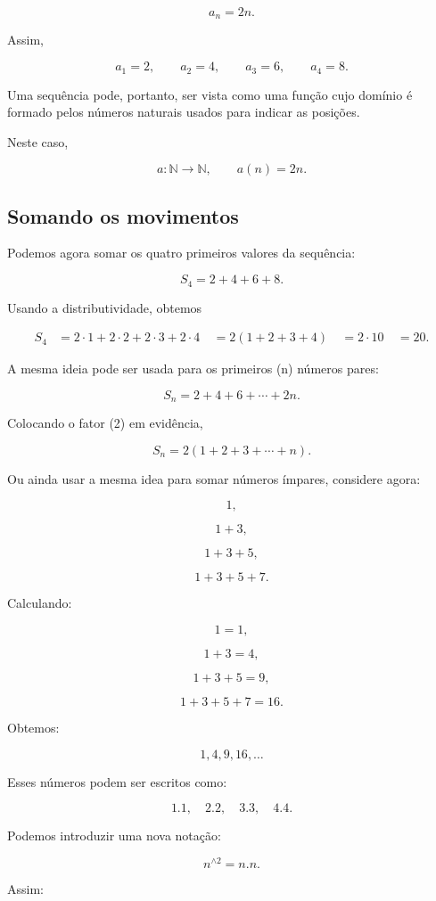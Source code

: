 \documentclass[12pt,a4paper]{article}
\begin{document}
\[
a_n=2n.
\]

Assim,

\[
a_1=2,\qquad
a_2=4,\qquad
a_3=6,\qquad
a_4=8.
\]

Uma sequência pode, portanto, ser vista como uma função cujo domínio é
formado pelos números naturais usados para indicar as posições.

Neste caso,

\[
a\colon\mathbb{N}\longrightarrow\mathbb{N},
\qquad
a(n)=2n.
\]

\subsection{Somando os movimentos}

Podemos agora somar os quatro primeiros valores da sequência:

\[
S_4=2+4+6+8.
\]

Usando a distributividade, obtemos

\[
\begin{aligned}
S_4
&=2\cdot1+2\cdot2+2\cdot3+2\cdot4\
&=2(1+2+3+4)\
&=2\cdot10\
&=20.
\end{aligned}
\]

A mesma ideia pode ser usada para os primeiros (n) números pares:

\[
S_n=2+4+6+\cdots+2n.
\]

Colocando o fator (2) em evidência,

\[
S_n=2(1+2+3+\cdots+n).
\]


Ou ainda usar a mesma idea para somar números ímpares, considere agora:

\[
1,
\]

\[
1+3,
\]

\[
1+3+5,
\]

\[
1+3+5+7.
\]

Calculando:

\[
1=1,
\]

\[
1+3=4,
\]

\[
1+3+5=9,
\]

\[
1+3+5+7=16.
\]

Obtemos:

\[
1,4,9,16,\ldots
\]

Esses números podem ser escritos como:

\[
1.1,\quad 2.2,\quad 3.3,\quad 4.4.
\]

Podemos introduzir uma nova notação:

\[
n^{\wedge 2}=n.n.
\]

Assim:
\end{document}
